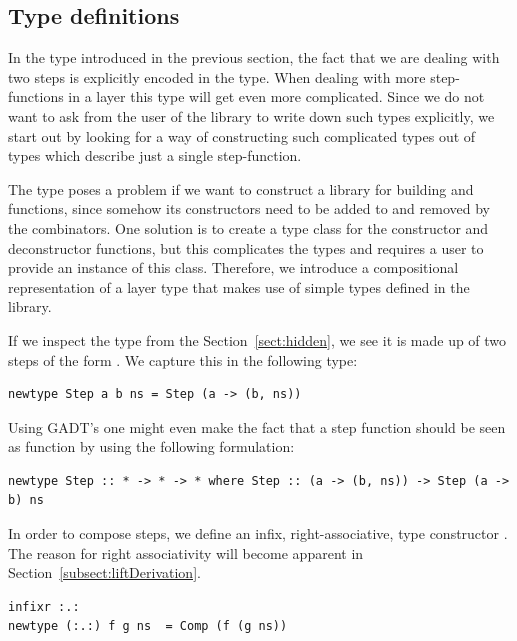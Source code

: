 \documentclass{llncs}
\begin{document}
\subsection{Type definitions} \label{subsecttypedef}

In the  type introduced in the previous section, the fact that we are dealing with two steps is explicitly encoded in the type. When dealing with more step-functions in a layer this type will get even more complicated. Since we do not want to ask from the user of the library to write  down such types explicitly, we start out by looking for a way of constructing such complicated types out of types which describe just a single step-function.
\ec

The  type poses a problem if we want to construct a library for building  and  functions, since somehow its constructors need to be added to and removed by the combinators. One solution is to create a type class for the constructor and deconstructor functions, but this complicates the types and requires a user to provide an instance of this class. Therefore, we introduce a compositional representation of a layer type that makes use of simple types defined in the library.

If we inspect the  type from the Section~\ref{sect:hidden}, we see it is made up of two steps of the form . We  capture this in the following type:

\begin{small}
\begin{verbatim}
newtype Step a b ns = Step (a -> (b, ns))
\end{verbatim}
\end{small}

\bc
Using GADT's one might even make the fact that a step function should be seen as function by using the following formulation:

\begin{small}
\begin{verbatim}
newtype Step :: * -> * -> * where Step :: (a -> (b, ns)) -> Step (a -> b) ns
\end{verbatim}
\end{small}
\ec

In order to compose steps, we define an infix, right-associative, type constructor .
The reason for right associativity will become apparent in Section~\ref{subsect:liftDerivation}.

\begin{small}
\begin{verbatim}
infixr :.:
newtype (:.:) f g ns  = Comp (f (g ns))
\end{verbatim}
\end{small}
\end{document}
